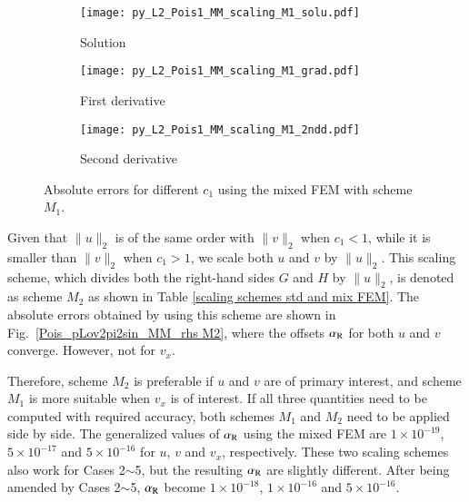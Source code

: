 \documentclass[review,3p]{elsarticle}
\begin{document}
\vspace{0.0cm}
\begin{figure}[!ht]
    \begin{subfigure}{5.5cm}
        \texttt{[image: py\_L2\_Pois1\_MM\_scaling\_M1\_solu.pdf]}
        \caption{Solution}
        \label{py_L2_Pois1_MM_scaling_M1_solu}
    \end{subfigure}
    \hspace{-0.2cm}
    \begin{subfigure}{5.5cm}
        \texttt{[image: py\_L2\_Pois1\_MM\_scaling\_M1\_grad.pdf]}
        \caption{First derivative}
        \label{py_L2_Pois1_MM_scaling_M1_grad}
    \end{subfigure}
    \hspace{-0.2cm}
    \begin{subfigure}{5.5cm}
        \texttt{[image: py\_L2\_Pois1\_MM\_scaling\_M1\_2ndd.pdf]}
        \caption{Second derivative}
        \label{py_L2_Pois1_MM_scaling_M1_2ndd}
    \end{subfigure}
\caption{Absolute errors for different $c_1$ using the mixed FEM with scheme $M_1$.}    
\label{Pois_pLov2pi2sin_MM_rhs M1}
\end{figure}

\newpage
Given that ${\|u\|_{2}}$ is of the same order with ${\|v\|_{2}}$ when $c_1<1$, while it is smaller than ${\|v\|_{2}}$ when $c_1>1$, we scale both $u$ and $v$ by $\|u\|_{2}$. This scaling scheme, which divides both the right-hand sides $G$ and $H$ by $\|u\|_{2}$, is denoted as scheme $M_2$ as shown in Table \ref{scaling schemes std and mix FEM}. The absolute errors obtained by using this scheme are shown in Fig.~\ref{Pois_pLov2pi2sin_MM_rhs M2}, where the offsets $\alpha_{\rm R}$ for both $u$ and $v$ converge. However, not for $v_{x}$.

Therefore, scheme $M_2$ is preferable if $u$ and $v$ are of primary interest, and scheme $M_1$ is more suitable when $v_{x}$ is of interest. 
If all three quantities need to be computed with required accuracy, both schemes $M_1$ and $M_2$ need to be applied side by side. 
The generalized values of $\alpha_{\rm R}$ using the mixed FEM are $1\times10^{-19}$, $5\times10^{-17}$ and $5\times10^{-16}$ for $u$, $v$ and $v_{x}$, respectively. 
These two scaling schemes also work for Cases 2$\sim$5, but the resulting $\alpha_{\rm R}$ are slightly different. After being amended by Cases 2$\sim$5, $\alpha_{\rm R}$ become $1\times10^{-18}$, $1\times10^{-16}$ and $5\times10^{-16}$.
\end{document}
